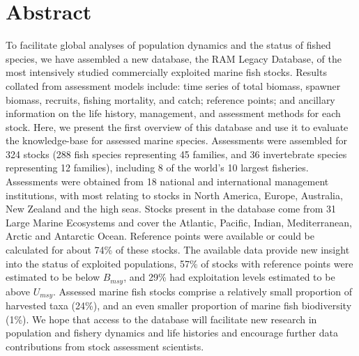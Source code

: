 \section*{Abstract}


To facilitate global analyses of population dynamics and the status of
fished species, we have assembled a new database, the RAM Legacy
Database, of the most intensively studied commercially exploited
marine fish stocks. Results collated from assessment models include:
time series of total biomass, spawner biomass, recruits, fishing
mortality, and catch; reference points; and ancillary information on
the life history, management, and assessment methods for each stock.
Here, we present the first overview of this database and use it to
evaluate the knowledge-base for assessed marine species.  Assessments
were assembled for 324 stocks
(288 fish species representing
45 families, and 36
invertebrate species representing 12
families), including 8 of the world's 10 largest fisheries.
Assessments were obtained from 18 national and international
management institutions, with most relating to stocks in North
America, Europe, Australia, New Zealand and the high seas. Stocks
present in the database come from 31 Large
Marine Ecosystems and cover the Atlantic, Pacific, Indian,
Mediterranean, Arctic and Antarctic Ocean. Reference points were
available or could be calculated for about
74\% of these stocks. The available data
provide new insight into the status of exploited populations,
57\% of stocks with reference points
were estimated to be below $B_{msy}$, and
29\% had exploitation levels
estimated to be above $U_{msy}$.  Assessed marine fish stocks comprise
a relatively small proportion of harvested taxa (24\%), and an even
smaller proportion of marine fish biodiversity (1\%). We hope that
access to the database will facilitate new research in population and
fishery dynamics and life histories and encourage further data
contributions from stock assessment scientists.

